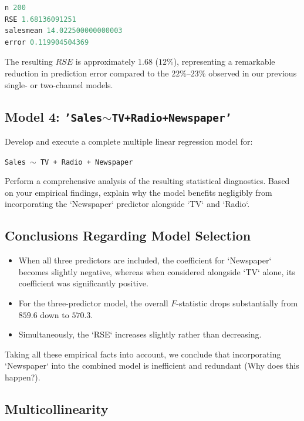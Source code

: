 \begin{lstlisting}[language=Python]
n 200
RSE 1.68136091251
salesmean 14.022500000000003
error 0.119904504369
\end{lstlisting}

The resulting $RSE$ is approximately $1.68$ ($12\%$), representing a remarkable reduction in prediction error compared to the $22\%$--$23\%$ observed in our previous single- or two-channel models.

\subsection{Model 4: \texttt{'Sales$\sim$TV+Radio+Newspaper'}}

\begin{ejemplo}
	Develop and execute a complete multiple linear regression model for:
	\begin{center}
		\texttt{Sales $\sim$ TV + Radio + Newspaper}
	\end{center}
	Perform a comprehensive analysis of the resulting statistical diagnostics. Based on your empirical findings, explain why the model benefits negligibly from incorporating the `Newspaper` predictor alongside `TV` and `Radio`.
\end{ejemplo}

\subsection{Conclusions Regarding Model Selection}
\begin{itemize}
	\item When all three predictors are included, the coefficient for `Newspaper` becomes slightly negative, whereas when considered alongside `TV` alone, its coefficient was significantly positive.
	\item For the three-predictor model, the overall $F$-statistic drops substantially from $859.6$ down to $570.3$.
	\item Simultaneously, the `RSE` increases slightly rather than decreasing.
\end{itemize}
Taking all these empirical facts into account, we conclude that incorporating `Newspaper` into the combined model is inefficient and redundant (Why does this happen?).

\subsection{Multicollinearity}


